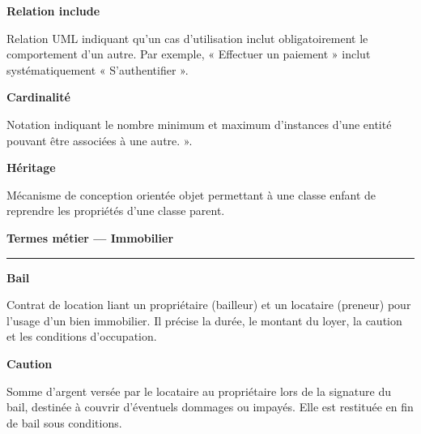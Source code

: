 \documentclass[12pt,a4paper]{report}
\begin{document}
\vspace{0.6cm}

\begin{infobox}
\textbf{Relation include}

Relation UML indiquant qu'un cas d'utilisation inclut obligatoirement le comportement d'un autre. Par exemple, « Effectuer un paiement » inclut systématiquement « S'authentifier ».
\end{infobox}

\vspace{0.6cm}

\begin{infobox}
\textbf{Cardinalité}

Notation indiquant le nombre minimum et maximum d'instances d'une entité pouvant être associées à une autre. ».
\end{infobox}

\vspace{0.6cm}

\begin{infobox}
\textbf{Héritage}

Mécanisme de conception orientée objet permettant à une classe enfant de reprendre les propriétés d'une classe parent. 
\end{infobox}

\newpage

{\Large\textcolor{marine}{\textbf{Termes métier — Immobilier}}}

\vspace{0.2cm}
{\textcolor{grismoyen}{\rule{\textwidth}{0.4pt}}}

\vspace{0.6cm}

\begin{infobox}
\textbf{Bail}

Contrat de location liant un propriétaire (bailleur) et un locataire (preneur) pour l'usage d'un bien immobilier. Il précise la durée, le montant du loyer, la caution et les conditions d'occupation.
\end{infobox}

\vspace{0.6cm}

\begin{infobox}
\textbf{Caution}

Somme d'argent versée par le locataire au propriétaire lors de la signature du bail, destinée à couvrir d'éventuels dommages ou impayés. Elle est restituée en fin de bail sous conditions.
\end{infobox}
\end{document}
